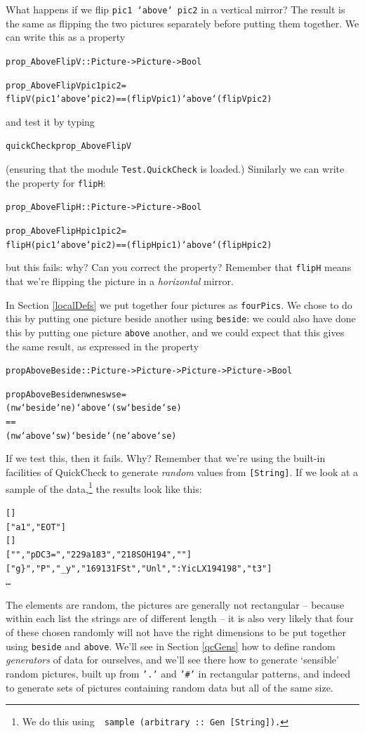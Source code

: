 What happens if we flip \texttt{pic1 `above` pic2} in a vertical mirror? The result is the same as flipping the two pictures separately before putting them together. We can write this as a property
\begin{alltt}
prop_AboveFlipV :: Picture -> Picture -> Bool

prop_AboveFlipV pic1 pic2 = 
    flipV (pic1 `above` pic2) == (flipV pic1) `above` (flipV pic2) 
\end{alltt}
and test it by typing
\begin{alltt}
quickCheck prop_AboveFlipV
\end{alltt}
(ensuring that the module \texttt{Test.QuickCheck} is loaded.) Similarly we can write the property for \texttt{flipH}:
\begin{alltt}
prop_AboveFlipH :: Picture -> Picture -> Bool

prop_AboveFlipH pic1 pic2 = 
    flipH (pic1 `above` pic2) == (flipH pic1) `above` (flipH pic2) 
\end{alltt}
but this fails: why? Can you correct the property? Remember that \texttt{flipH} means that we're flipping the picture in a \emph{horizontal} mirror.

In Section \ref{localDefs} we put together four pictures as \texttt{fourPics}. We chose to do this by putting one picture beside another using \texttt{beside}: we could also have done this by putting one picture \texttt{above} another, and we could expect that this gives the same result, as expressed in the property
\begin{alltt}
propAboveBeside :: Picture -> Picture ->  Picture -> Picture -> Bool

propAboveBeside nw ne sw se =
  (nw `beside` ne) `above` (sw `beside` se) 
  == 
  (nw `above` sw) `beside` (ne `above` se) 
\end{alltt}
If we test this, then it fails. Why? Remember that we're using the built-in facilities of QuickCheck to generate \emph{random} values from \texttt{[String]}. If we look at a sample of the data,\footnote{We do this using\ \ \texttt{sample (arbitrary ::\ Gen\  [String]).}} the results look like this:
\begin{alltt}
[]
["a1","\bs{}EOT"]
[]
["","p\bs{}DC3=","\bs{}229\bs{}a\bs{}183","\bs{}218\bs{}SOH\bs{}194",""]
["g\}","P","_y","\bs{}169\bs{}131\bs{}FS\bs{}t","U\bs{}nl",":YicLX\bs{}194\bs{}198","\bs{}t3"] 
 \ldots
\end{alltt}
The elements are random, the pictures are generally not rectangular -- because within each list the strings are of different length -- it is also very likely that four of these chosen randomly will not have the right dimensions to be put together using \texttt{beside} and \texttt{above}. We'll see in Section \ref{qcGens} how to define random \emph{generators} of data for ourselves, and we'll see there how to generate `sensible' random pictures, built up from \texttt{'.'} and \texttt{'\#'} in rectangular patterns, and indeed to generate sets of pictures containing random data but all of the same size.

